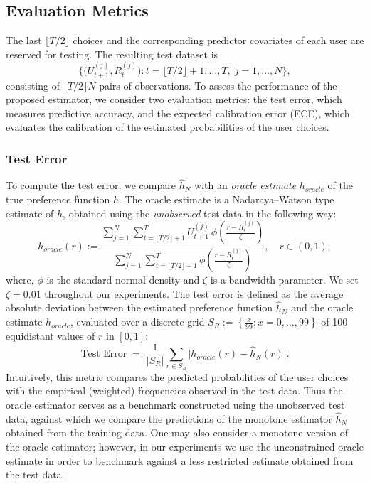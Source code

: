 \documentclass[12pt]{amsart}
\theoremstyle{plain}
\theoremstyle{remark}
\numberwithin{equation}{section}
\begin{document}
\subsection{Evaluation Metrics}

The last \(\lfloor T/2 \rfloor\)  choices and the corresponding predictor covariates 
of each user are reserved for testing. The resulting test dataset is
\[
\big\{ \big(U^{(j)}_{t+1}, R^{(j)}_{t}\big) : t = \lfloor T/2 \rfloor + 1, \ldots, T,\; j=1,\ldots,N \big\},
\]
consisting of \(\lfloor T/2 \rfloor N\) pairs of observations. To assess the performance of the proposed estimator, we consider two
evaluation metrics: the {test error}, which measures predictive accuracy, 
and the {expected calibration error (ECE)}, which evaluates the calibration 
of the estimated probabilities of the user choices.

\subsubsection{Test Error}

To compute the test  error, we compare $\hat{h}_N$ with an \emph{oracle estimate} ${h}_{oracle}$ of the true preference 
function $h$. The oracle estimate is a Nadaraya–Watson type estimate of $h$, obtained using the \emph{unobserved} test data in the following way:
\[
{h}_{oracle}(r)
:= \frac{ \sum_{j=1}^{N}\sum_{t=\lfloor T/2 \rfloor + 1}^{T}
   U^{(j)}_{t+1}\,\phi\left(\frac{r - R^{(j)}_{t}}{\zeta} \right)}{\sum_{j=1}^{N}\sum_{t=\lfloor T/2 \rfloor + 1}^{T}
          \phi\left(\frac{r - R^{(j)}_{t}}{\zeta}\right)}, \quad r \in (0,1),
\]
where, $\phi$ is the standard normal density and $\zeta$ is a bandwidth parameter. We set $\zeta = 0.01$ throughout our experiments. The test error is defined as the average absolute deviation between the estimated 
preference function \(\hat{h}_N\) and the oracle estimate $h_{oracle}$, evaluated over a discrete grid $S_R := \left\{\frac{x}{99} : x  = 0, \ldots, 99\right\}$ of 100 equidistant values of $r$ in $[0,1]$: 
\[
\text{Test Error} \;=\; \frac{1}{|S_R|} \sum_{r \in S_R} 
\big| {h}_{oracle}(r) - \hat{h}_N(r) \big|.
\]
Intuitively, this metric compares the predicted probabilities of the user choices
with the empirical (weighted) frequencies 
observed in the test data. 
Thus the oracle estimator serves as a benchmark constructed using the unobserved test data, against which we compare the predictions of the monotone estimator $\hat{h}_N$ obtained from the training data. One may also consider a monotone version of the oracle estimator; however, in our experiments we use the unconstrained oracle estimate in order to benchmark against a less restricted estimate obtained from the test data.
\end{document}
